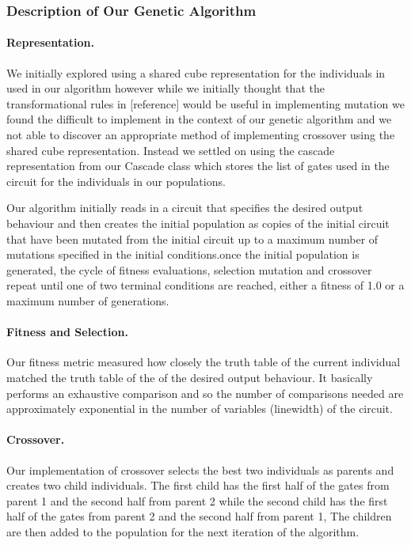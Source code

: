   \subsubsection{Description of Our Genetic Algorithm}

\paragraph{Representation.} 

We initially explored using a shared cube representation for the individuals in used in our algorithm however while we initially 
thought that the transformational rules  in [reference] would be useful in implementing mutation we found the difficult to implement 
in the context of our genetic algorithm and we not able to discover an appropriate method of implementing crossover using the shared 
cube representation. Instead we settled on using the cascade representation from our Cascade class which stores the list of gates used 
in the circuit for the individuals in our populations.

Our algorithm initially reads in a circuit that specifies the desired output behaviour and then creates the initial population as copies 
of the initial circuit that have been mutated from the initial circuit up to a maximum number of mutations specified in the initial 
conditions.once the initial population is generated, the cycle of fitness evaluations, selection mutation and crossover repeat until 
one of two terminal conditions are reached, either a fitness of 1.0 or a maximum number of generations.

\paragraph{Fitness and Selection.} 

Our fitness metric measured how closely the truth table of the current individual matched the truth table of the of 
the desired output behaviour. It basically performs an exhaustive comparison and so the number of comparisons needed are approximately
 exponential in the number of variables (linewidth) of the circuit.  


\paragraph{Crossover.}

Our implementation of crossover selects the best two individuals as parents and creates two child individuals. The first child has the 
first half of the gates from parent 1 and the second half from parent 2 while the second child has the first half of the gates from 
parent 2 and the second half from parent 1, The children are then added to the population for the next iteration of the algorithm. 


